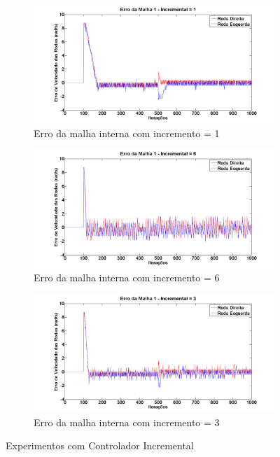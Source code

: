 \begin{figure}[!htb]
	\centering
	\begin{subfigure}{1.0\textwidth}
		\centering
		\includegraphics[width=.9\linewidth]{./Testes/Malha1/Incremental/Malha1_Inc1}
		\caption{Erro da malha interna com incremento = 1}
		\label{fig:contInc1}
	\end{subfigure}
	\begin{subfigure}{1.0\textwidth}
		\centering
		\includegraphics[width=.9\linewidth]{./Testes/Malha1/Incremental/Malha1_Inc6}
		\caption{Erro da malha interna com incremento = 6}
		\label{fig:contInc6}
	\end{subfigure}
	\begin{subfigure}{1.0\textwidth}
		\centering
		\includegraphics[width=.9\linewidth]{./Testes/Malha1/Incremental/Malha1_Inc3}
		\caption{Erro da malha interna com incremento = 3}
		\label{fig:contInc3}
	\end{subfigure}
	\caption{Experimentos com Controlador Incremental}
	\label{fig:contInc}
\end{figure}

